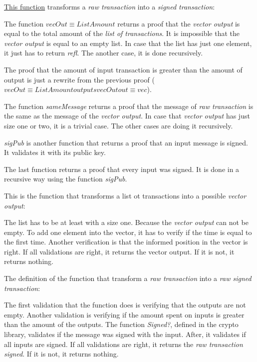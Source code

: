 \hyperref[rawToTX]{This function} transforms a \emph{raw transaction} into a \emph{signed transaction}:


The function $vecOut \equiv ListAmount$ returns a proof that the \emph{vector output} is equal
to the total amount of the \emph{list of transactions}.
It is impossible that the \emph{vector output} is equal to an empty list.
In case that the list has just one element, it just has to return \emph{refl}.
The another case, it is done recursively.

The proof that the amount of input transaction is greater than the amount of output
is just a rewrite from the previous proof ($vecOut≡ListAmount outputs vecOut out≡vec$).

The function \emph{sameMessage} returns a proof that the message of \emph{raw transaction}
is the same as the message of the \emph{vector output}.
In case that \emph{vector output} has just size one or two, it is a trivial case.
The other cases are doing it recursively.

\emph{sigPub} is another function that returns a proof that an input message is signed.
It validates it with its public key.

The last function returns a proof that every input was signed.
It is done in a recursive way using the function \emph{sigPub}.

This is the function that transforms a list ot transactions into a possible \emph{vector output}:


The list has to be at least with a size one.
Because the \emph{vector output} can not be empty.
To add one element into the vector, it has to verify if the time is equal to the first time.
Another verification is that the informed position in the vector is right.
If all validations are right, it returns the vector output.
If it is not, it returns nothing.

The definition of the function that transform a \emph{raw transaction} into a
\emph{raw signed transaction}:


The first validation that the function does is verifying that the outputs are not empty.
Another validation is verifying if the amount spent on inputs is greater than the amount of the outputs.
The function \emph{Signed?}, defined in the crypto library, validates if the
message was signed with the input.
After, it validates if all inputs are signed.
If all validations are right, it returns the \emph{raw transaction signed}.
If it is not, it returns nothing.
